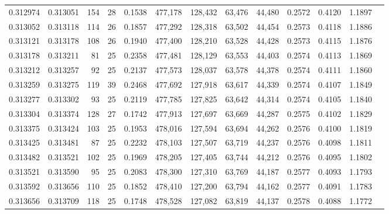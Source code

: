 \begin{tabular}{rrrrrrrrrrrrr}
0.312974 & 0.313051 &   154 &  28 &                                     0.1538 & 477,178 & 128,432 &  63,476 &  44,480 & 0.2572 & 0.4120 & 1.1897 \\
0.313052 & 0.313118 &   114 &  26 &                                     0.1857 & 477,292 & 128,318 &  63,502 &  44,454 & 0.2573 & 0.4118 & 1.1886 \\
0.313121 & 0.313178 &   108 &  26 &                                     0.1940 & 477,400 & 128,210 &  63,528 &  44,428 & 0.2573 & 0.4115 & 1.1876 \\
0.313178 & 0.313211 &    81 &  25 &                                     0.2358 & 477,481 & 128,129 &  63,553 &  44,403 & 0.2574 & 0.4113 & 1.1869 \\
0.313212 & 0.313257 &    92 &  25 &                                     0.2137 & 477,573 & 128,037 &  63,578 &  44,378 & 0.2574 & 0.4111 & 1.1860 \\
0.313259 & 0.313275 &   119 &  39 &                                     0.2468 & 477,692 & 127,918 &  63,617 &  44,339 & 0.2574 & 0.4107 & 1.1849 \\
0.313277 & 0.313302 &    93 &  25 &                                     0.2119 & 477,785 & 127,825 &  63,642 &  44,314 & 0.2574 & 0.4105 & 1.1840 \\
0.313304 & 0.313374 &   128 &  27 &                                     0.1742 & 477,913 & 127,697 &  63,669 &  44,287 & 0.2575 & 0.4102 & 1.1829 \\
0.313375 & 0.313424 &   103 &  25 &                                     0.1953 & 478,016 & 127,594 &  63,694 &  44,262 & 0.2576 & 0.4100 & 1.1819 \\
0.313425 & 0.313481 &    87 &  25 &                                     0.2232 & 478,103 & 127,507 &  63,719 &  44,237 & 0.2576 & 0.4098 & 1.1811 \\
0.313482 & 0.313521 &   102 &  25 &                                     0.1969 & 478,205 & 127,405 &  63,744 &  44,212 & 0.2576 & 0.4095 & 1.1802 \\
0.313521 & 0.313590 &    95 &  25 &                                     0.2083 & 478,300 & 127,310 &  63,769 &  44,187 & 0.2577 & 0.4093 & 1.1793 \\
0.313592 & 0.313656 &   110 &  25 &                                     0.1852 & 478,410 & 127,200 &  63,794 &  44,162 & 0.2577 & 0.4091 & 1.1783 \\
0.313656 & 0.313709 &   118 &  25 &                                     0.1748 & 478,528 & 127,082 &  63,819 &  44,137 & 0.2578 & 0.4088 & 1.1772 \\

\end{tabular}
